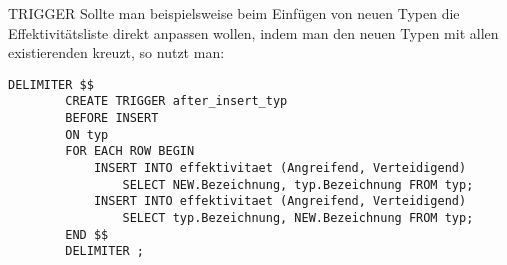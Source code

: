 \begin{sql}{TRIGGER}
    Sollte man beispielsweise beim Einfügen von neuen Typen die Effektivitätsliste direkt anpassen wollen, indem man den neuen Typen mit allen existierenden kreuzt, so nutzt man:

    \begin{lstlisting}[language=mysql]
        DELIMITER $$
        CREATE TRIGGER after_insert_typ
        BEFORE INSERT
        ON typ
        FOR EACH ROW BEGIN
            INSERT INTO effektivitaet (Angreifend, Verteidigend)
                SELECT NEW.Bezeichnung, typ.Bezeichnung FROM typ;
            INSERT INTO effektivitaet (Angreifend, Verteidigend)
                SELECT typ.Bezeichnung, NEW.Bezeichnung FROM typ;
        END $$
        DELIMITER ;
    \end{lstlisting}
\end{sql}